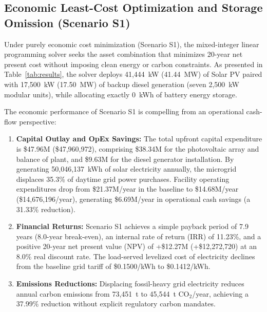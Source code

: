 \documentclass[11pt,a4paper]{article}
\begin{document}
\subsection{Economic Least-Cost Optimization and Storage Omission (Scenario S1)}
\label{subsec:results_s1}

Under purely economic cost minimization (Scenario S1), the mixed-integer linear programming solver seeks the asset combination that minimizes 20-year net present cost without imposing clean energy or carbon constraints. As presented in Table~\ref{tab:results}, the solver deploys 41,444~kW (41.44~MW) of Solar PV paired with 17,500~kW (17.50~MW) of backup diesel generation (seven 2,500~kW modular units), while allocating exactly 0~kWh of battery energy storage.

The economic performance of Scenario S1 is compelling from an operational cash-flow perspective:
\begin{enumerate}
    \item \textbf{Capital Outlay and OpEx Savings:} The total upfront capital expenditure is \$47.96M (\$47,960,972), comprising \$38.34M for the photovoltaic array and balance of plant, and \$9.63M for the diesel generator installation. By generating 50,046,137~kWh of solar electricity annually, the microgrid displaces 35.3\% of daytime grid power purchases. Facility operating expenditures drop from \$21.37M/year in the baseline to \$14.68M/year (\$14,676,196/year), generating \$6.69M/year in operational cash savings (a 31.33\% reduction).
    \item \textbf{Financial Returns:} Scenario S1 achieves a simple payback period of 7.9 years (8.0-year break-even), an internal rate of return (IRR) of 11.23\%, and a positive 20-year net present value (NPV) of +\$12.27M (+\$12,272,720) at an 8.0\% real discount rate. The load-served levelized cost of electricity declines from the baseline grid tariff of \$0.1500/kWh to \$0.1412/kWh.
    \item \textbf{Emissions Reductions:} Displacing fossil-heavy grid electricity reduces annual carbon emissions from 73,451~t to 45,544~t CO$_2$/year, achieving a 37.99\% reduction without explicit regulatory carbon mandates.
\end{enumerate}
\end{document}
